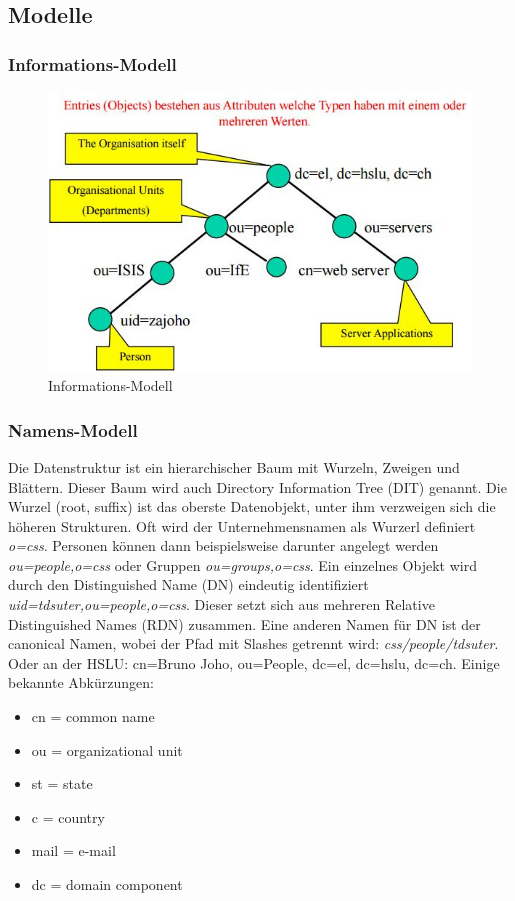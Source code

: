 \subsection{Modelle}

\subsubsection{Informations-Modell}
\begin{figure}[h!]
\centering
\includegraphics[width=0.6\linewidth]{fig/ldap-informations-modell}
\caption{Informations-Modell}
\label{fig:ldap-informations-modell}
\end{figure}

\subsubsection{Namens-Modell}
Die Datenstruktur ist ein hierarchischer Baum mit Wurzeln, Zweigen und Blättern. Dieser Baum wird auch Directory Information Tree (DIT) genannt. Die Wurzel (root, suffix) ist das oberste Datenobjekt, unter ihm verzweigen sich die höheren Strukturen. Oft wird der Unternehmensnamen als Wurzerl definiert \emph{o=css}. Personen können dann beispielsweise darunter angelegt werden \emph{ou=people,o=css} oder Gruppen \emph{ou=groups,o=css}. Ein einzelnes Objekt wird durch den Distinguished Name (DN) eindeutig identifiziert \emph{uid=tdsuter,ou=people,o=css}. Dieser setzt sich aus mehreren Relative Distinguished Names (RDN) zusammen. Eine anderen Namen für DN ist der canonical Namen, wobei der Pfad mit Slashes getrennt wird: \emph{css/people/tdsuter}. Oder an der HSLU: cn=Bruno Joho, ou=People, dc=el, dc=hslu, dc=ch. Einige bekannte Abkürzungen:

\begin{itemize}
	\item cn = common name
	\item ou = organizational unit
	\item st = state
	\item c = country
	\item mail = e-mail
	\item dc = domain component
\end{itemize}

